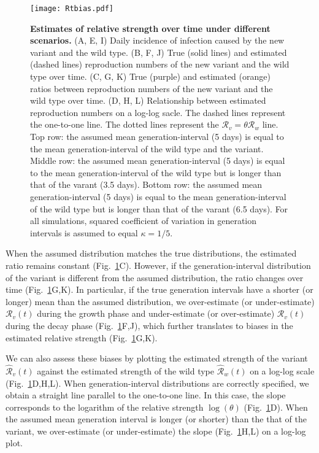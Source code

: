 \documentclass[12pt]{article}
\newcommand{\fref}[1]{Fig.~\ref{fig:#1}}
\newcommand{\RR}{\ensuremath{{\mathcal R}}\xspace}
\begin{document}
\begin{figure}[!th]
\texttt{[image: Rtbias.pdf]}
\caption{
\textbf{Estimates of relative strength over time under different scenarios.}
(A, E, I) Daily incidence of infection caused by the new variant and the wild type.
(B, F, J) True (solid lines) and estimated (dashed lines) reproduction numbers of the new variant and the wild type over time.
(C, G, K) True (purple) and estimated (orange) ratios between reproduction numbers of the new variant and the wild type over time.
(D, H, L) Relationship between estimated reproduction numbers on a log-log sacle.
The dashed lines represent the one-to-one line. 
The dotted lines represent the $\RR_v=\theta \RR_w$ line. 
Top row: the assumed mean generation-interval (5 days) is equal to the mean generation-interval of the wild type and the variant.
Middle row: the assumed mean generation-interval (5 days) is equal to the mean generation-interval of the wild type but is longer than that of the varant (3.5 days).
Bottom row: the assumed mean generation-interval (5 days) is equal to the mean generation-interval of the wild type but is longer than that of the varant (6.5 days).
For all simulations, squared coefficient of variation in generation intervals is assumed to equal $\kappa = 1/5$.
}
\label{fig:Rtbias}
\end{figure}

When the assumed distribution matches the true distributions, the estimated ratio remains constant (\fref{Rtbias}C).
However, if the generation-interval distribution of the variant is different from the assumed distribution, the ratio changes over time (\fref{Rtbias}G,K).
In particular, if the true generation intervals have a shorter (or longer) mean than the assumed distribution, we over-estimate (or under-estimate) $\RR_v(t)$ during the growth phase and under-estimate (or over-estimate) $\RR_v(t)$ during the decay phase (\fref{Rtbias}F,J), which further translates to biases in the estimated relative strength (\fref{Rtbias}G,K).

We can also assess these biases by plotting the estimated strength of the variant $\hat{\RR}_v(t)$ against the estimated strength of the wild type $\hat{\RR}_w(t)$ on a log-log scale (\fref{Rtbias}D,H,L).
When generation-interval distributions are correctly specified, we obtain a straight line parallel to the one-to-one line. 
In this case, the slope corresponds to the logarithm of the relative strength $\log(\theta)$ (\fref{Rtbias}D).
When the assumed mean generation interval is longer (or shorter) than the that of the variant, we over-estimate (or under-estimate) the slope (\fref{Rtbias}H,L) on a log-log plot.
\end{document}
